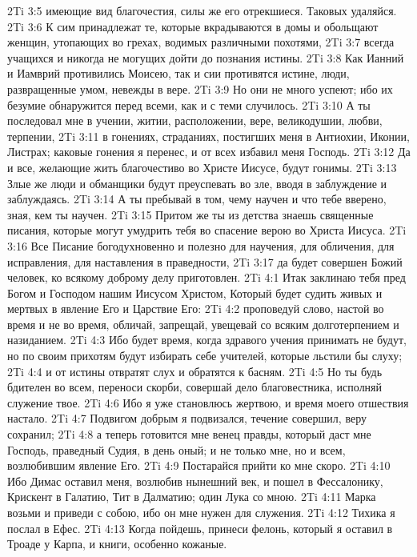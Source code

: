 \vs 2Ti 3:5 имеющие вид благочестия, силы же его отрекшиеся. Таковых удаляйся.
\vs 2Ti 3:6 К сим принадлежат те, которые вкрадываются в домы и обольщают женщин, утопающих во грехах, водимых различными похотями,
\vs 2Ti 3:7 всегда учащихся и никогда не могущих дойти до познания истины.
\vs 2Ti 3:8 Как Ианний и Иамврий противились Моисею, так и сии противятся истине, люди, развращенные умом, невежды в вере.
\vs 2Ti 3:9 Но они не много успеют; ибо их безумие обнаружится перед всеми, как и с теми случилось.
\vs 2Ti 3:10 А ты последовал мне в учении, житии, расположении, вере, великодушии, любви, терпении,
\vs 2Ti 3:11 в гонениях, страданиях, постигших меня в Антиохии, Иконии, Листрах; каковые гонения я перенес, и от всех избавил меня Господь.
\vs 2Ti 3:12 Да и все, желающие жить благочестиво во Христе Иисусе, будут гонимы.
\vs 2Ti 3:13 Злые же люди и обманщики будут преуспевать во зле, вводя в заблуждение и заблуждаясь.
\vs 2Ti 3:14 А ты пребывай в том, чему научен и что тебе вверено, зная, кем ты научен.
\vs 2Ti 3:15 Притом же ты из детства знаешь священные писания, которые могут умудрить тебя во спасение верою во Христа Иисуса.
\vs 2Ti 3:16 Все Писание богодухновенно и полезно для научения, для обличения, для исправления, для наставления в праведности,
\vs 2Ti 3:17 да будет совершен Божий человек, ко всякому доброму делу приготовлен.
\vs 2Ti 4:1 Итак заклинаю тебя пред Богом и Господом нашим Иисусом Христом, Который будет судить живых и мертвых в явление Его и Царствие Его:
\vs 2Ti 4:2 проповедуй слово, настой во время и не во время, обличай, запрещай, увещевай со всяким долготерпением и назиданием.
\vs 2Ti 4:3 Ибо будет время, когда здравого учения принимать не будут, но по своим прихотям будут избирать себе учителей, которые льстили бы слуху;
\vs 2Ti 4:4 и от истины отвратят слух и обратятся к басням.
\vs 2Ti 4:5 Но ты будь бдителен во всем, переноси скорби, совершай дело благовестника, исполняй служение твое.
\rsbpar\vs 2Ti 4:6 Ибо я уже становлюсь жертвою, и время моего отшествия настало.
\vs 2Ti 4:7 Подвигом добрым я подвизался, течение совершил, веру сохранил;
\vs 2Ti 4:8 а теперь готовится мне венец правды, который даст мне Господь, праведный Судия, в день оный; и не только мне, но и всем, возлюбившим явление Его.
\rsbpar\vs 2Ti 4:9 Постарайся прийти ко мне скоро.
\vs 2Ti 4:10 Ибо Димас оставил меня, возлюбив нынешний век, и пошел в Фессалонику, Крискент в Галатию, Тит в Далматию; один Лука со мною.
\vs 2Ti 4:11 Марка возьми и приведи с собою, ибо он мне нужен для служения.
\vs 2Ti 4:12 Тихика я послал в Ефес.
\vs 2Ti 4:13 Когда пойдешь, принеси фелонь, который я оставил в Троаде у Карпа, и книги, особенно кожаные.
